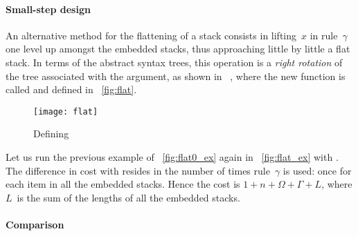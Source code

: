 \paragraph{Small-step design}

An alternative method for the flattening of a stack consists in
lifting~\(x\) in rule~\(\gamma\) one level up amongst the embedded
stacks, thus approaching little by little a flat stack. In terms of
the abstract syntax trees, this operation is a \emph{right
rotation} of the tree associated with the
argument, as shown in \figs~, where
the new function is called  and
defined in \fig~\vref{fig:flat}.
%
\begin{figure}
\centering
\texttt{[image: flat]}%
\caption{Defining }
\label{fig:flat}
\end{figure}
Let us run the previous example of
\fig~\vref{fig:flat0_ex} again in \fig~\vref{fig:flat_ex} with
. The difference in cost with
 resides in the number
of times rule~\(\gamma\) is used: once for each item in all the
embedded stacks. Hence the
cost\label{cost:flat} is \(1 + n + \Omega
+ \Gamma + L\), where \(L\)~is the sum of the lengths of all the
embedded stacks.

\paragraph{Comparison}

